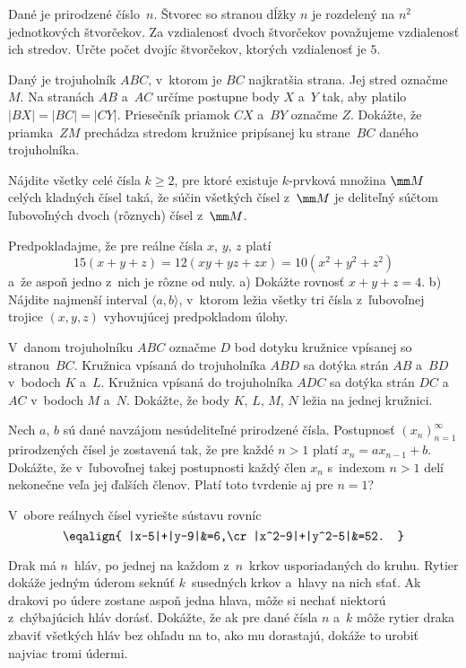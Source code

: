 ﻿{%
Dané je prirodzené číslo~$n$. Štvorec so stranou dĺžky $n$ je rozdelený na $n^2$ jednotkových štvorčekov. Za vzdialenosť dvoch štvorčekov považujeme vzdialenosť ich stredov. Určte počet dvojíc štvorčekov, ktorých vzdialenosť je $5$.}

{%
Daný je trojuholník $ABC$, v~ktorom je $BC$ najkratšia strana. Jej stred označme $M$. Na stranách $AB$ a~$AC$ určíme postupne body $X$ a~$Y$ tak, aby platilo $|BX|=|BC|=|CY|$. Priesečník priamok $CX$ a~$BY$ označme $Z$. Dokážte, že priamka~$ZM$ prechádza stredom kružnice pripísanej ku strane~$BC$ daného trojuholníka.}

{%
Nájdite všetky celé čísla $k\ge2$, pre ktoré existuje $k$-prvková množina $\mm M$ celých kladných čísel taká, že súčin všetkých čísel z~$\mm M$ je deliteľný súčtom ľubovoľných dvoch (rôznych) čísel z~$\mm M$.}

{%
Predpokladajme, že pre reálne čísla $x$, $y$, $z$ platí
$$
15(x + y + z) = 12(xy + yz + zx) = 10(x^2 + y^2 + z^2)
$$
a~že aspoň jedno z~nich je rôzne od nuly.
\ite a) Dokážte rovnosť $x + y + z = 4$.
\ite b) Nájdite najmenší interval $\langle a,b\rangle$, v~ktorom ležia všetky tri čísla z~ľubovoľnej trojice $(x,y,z)$ vyhovujúcej predpokladom úlohy.\endgraf}

{%
V~danom trojuholníku $ABC$ označme $D$ bod dotyku kružnice vpísanej so stranou~$BC$. Kružnica vpísaná do trojuholníka $ABD$ sa dotýka strán $AB$ a~$BD$ v~bodoch $K$ a~$L$. Kružnica vpísaná do trojuholníka $ADC$ sa dotýka strán $DC$ a~$AC$ v~bodoch $M$ a~$N$. Dokážte,
že body $K$, $L$, $M$, $N$ ležia na jednej kružnici.}

{%
Nech $a$, $b$ sú dané navzájom nesúdeliteľné prirodzené čísla.
Postupnosť $(x_n)_{n=1}^{\infty}$ prirodzených
čísel je zostavená tak, že pre každé $n>1$ platí $x_n=ax_{n-1}+b$.
Dokážte, že v~ľubovoľnej takej postupnosti každý člen
$x_n$ s~indexom $n>1$ delí nekonečne veľa jej ďalších členov. Platí toto tvrdenie aj pre $n=1$?}

{%
V~obore reálnych čísel vyriešte sústavu rovníc
$$\eqalign{
|x-5|+|y-9|&=6,\cr
|x^2-9|+|y^2-5|&=52.
}$$}

{%
Drak má $n$~hláv, po jednej na každom z~$n$~krkov usporiadaných do kruhu.
Rytier dokáže jedným úderom seknúť $k$~susedných krkov a~hlavy na
nich sťať. Ak drakovi po údere zostane aspoň jedna hlava, môže
si nechať niektorú z~chýbajúcich hláv dorásť. Dokážte, že ak pre
dané čísla $n$ a~$k$ môže rytier draka zbaviť všetkých hláv bez ohľadu na
to, ako mu dorastajú, dokáže to urobiť najviac tromi údermi.
}

